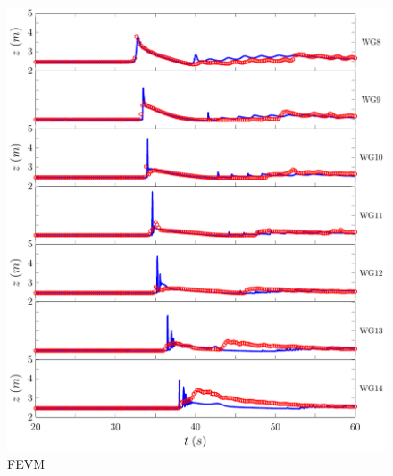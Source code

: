\begin{figure}
	\centering
	\includegraphics[width=\textwidth]{./chp6/figures/Experiment/Roeber/Trial8/FEVM/LongWGs2.pdf}
	\caption{FEVM}
	\label{fig:Roeber8WG7to14FEVM}
\end{figure}          

